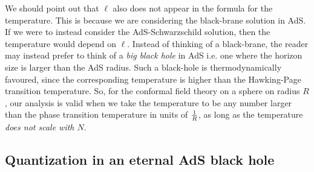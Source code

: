 We should point out that $\ell$ also does not appear in the formula for the temperature. This is because we are considering the black-brane solution in AdS. If we were to instead consider the AdS-Schwarzschild solution, then the temperature would depend on $\ell$. Instead of thinking of a black-brane, the reader may instead prefer to think of a {\em big black hole} in AdS i.e. one where the horizon size is larger than the AdS radius.  Such a black-hole is thermodynamically favoured, since the corresponding temperature is higher than the Hawking-Page transition temperature. So, for the conformal field theory on a sphere on radius $R$, our analysis is valid when we take the temperature to be any number larger than the phase transition temperature in units of  ${1 \over R}$, as long as the temperature {\em does not scale with $N$}.  


\subsection{Quantization in an eternal AdS black hole \label{modesbrane}}


